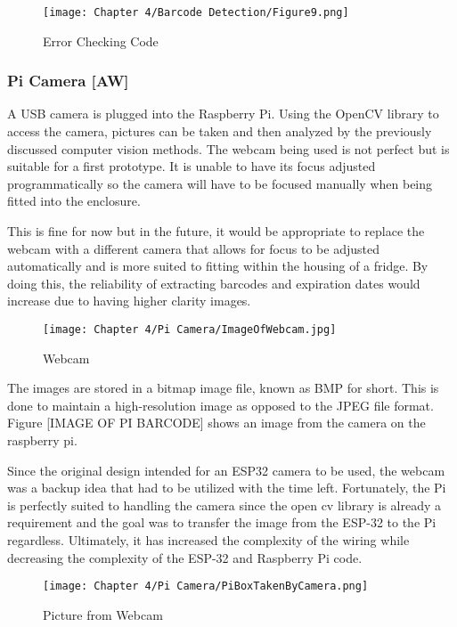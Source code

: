 \begin{figure}[H]        
    \centering
    \texttt{[image: Chapter 4/Barcode Detection/Figure9.png]}
    \caption{Error Checking Code}
    \label{fig:bc9} 
\end{figure} 

\subsubsection{Pi Camera [AW]}

A USB camera is plugged into the Raspberry Pi.
Using the OpenCV library to access the camera, pictures can be taken and then analyzed by the previously discussed computer vision methods.
The webcam being used is not perfect but is suitable for a first prototype.
It is unable to have its focus adjusted programmatically so the camera will have to be focused manually when being fitted into the enclosure.

This is fine for now but in the future, it would be appropriate to replace the webcam with a different camera that allows for focus to be adjusted automatically and is more suited to fitting within the housing of a fridge.
By doing this, the reliability of extracting barcodes and expiration dates would increase due to having higher clarity images.

\begin{figure}[H]        
    \centering
    \texttt{[image: Chapter 4/Pi Camera/ImageOfWebcam.jpg]}
    \caption{Webcam}
    \label{fig:webcam} 
\end{figure} 

The images are stored in a bitmap image file, known as BMP for short.
This is done to maintain a high-resolution image as opposed to the JPEG file format.
Figure [IMAGE OF PI BARCODE] shows an image from the camera on the raspberry pi.

Since the original design intended for an ESP32 camera to be used, the webcam was a backup idea that had to be utilized with the time left.
Fortunately, the Pi is perfectly suited to handling the camera since the open cv library is already a requirement and the goal was to transfer the image from the ESP-32 to the Pi regardless.
Ultimately, it has increased the complexity of the wiring while decreasing the complexity of the ESP-32 and Raspberry Pi code.

\begin{figure}[H]        
    \centering
    \texttt{[image: Chapter 4/Pi Camera/PiBoxTakenByCamera.png]}
    \caption{Picture from Webcam}
    \label{fig:webcampic} 
\end{figure} 

